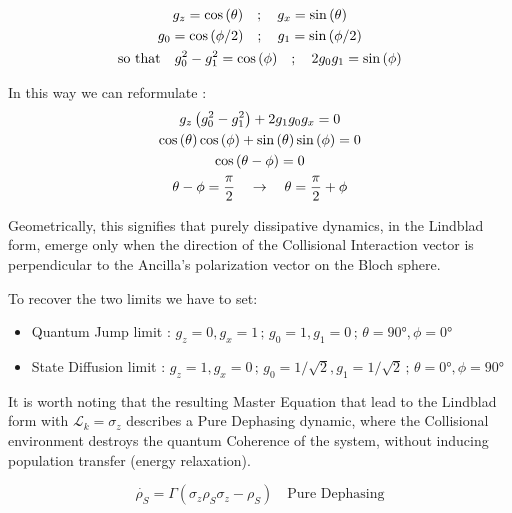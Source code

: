 \documentclass[a4paper,12pt]{article}
\begin{document}
	\begin{gather}
		g_z = \cos{(\theta)} \quad ; \quad g_x = \sin{(\theta)} \label{eq:gz_gx_geom_def} \\
		g_0 = \cos{(\phi/2)} \quad ; \quad g_1 = \sin{(\phi/2)} \label{eq:g0_g1_geom_def} \\
		\text{so that} \quad g_0^2 - g_1^2 = \cos{(\phi)} \quad ; \quad 2g_0g_1 = \sin{(\phi)} \notag
	\end{gather}

	In this way we can reformulate :
	\begin{gather}
		g_{z}\left(g_{0}^{2} - g_{1}^{2} \right) + 2 g_{1} g_{0} g_{x} = 0 \notag \\
		\cos{(\theta)}\cos{(\phi)} + \sin{(\theta)}\sin{(\phi)} = 0 \notag \\
		\cos{(\theta - \phi)} = 0 \notag \\
		\theta - \phi = \frac{\pi}{2} \quad \rightarrow \quad \theta = \frac{\pi}{2} + \phi
		\label{eq:g_equivalnce_geom_sol}
	\end{gather}

	Geometrically, this signifies that purely dissipative dynamics, in the Lindblad form, emerge only when the direction of the Collisional Interaction vector is perpendicular to the Ancilla's polarization vector on the Bloch sphere.

	\newpage

	To recover the two limits we have to set:

	\begin{itemize}
		\item Quantum Jump limit : $ g_z = 0 , g_x = 1 \, ; \, g_0 = 1 , g_1 = 0 \, ; \, \theta = 90° , \phi = 0° $
		\item State Diffusion limit : $ g_z = 1 , g_x = 0 \, ; \, g_0 = 1/\sqrt{2} , g_1 = 1/\sqrt{2} \, ; \, \theta = 0° , \phi = 90° $
	\end{itemize}

	It is worth noting that the resulting Master Equation that lead to the Lindblad form with $ \mathcal{L}_k = \sigma_{z} $ describes a Pure Dephasing dynamic, where the Collisional environment destroys the quantum Coherence of the system, without inducing population transfer (energy relaxation).

	\begin{equation}
		\dot{\rho_S} = \Gamma \left(\sigma_{z} \rho_S \sigma_{z} - \rho_S \right) \quad \text{Pure Dephasing}
		\label{eq:lindblad_pure_deph_recover}
	\end{equation}
\end{document}
